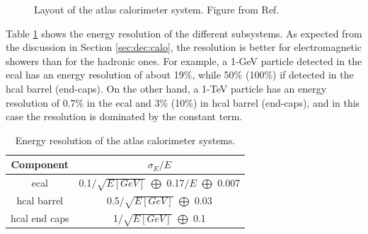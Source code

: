 \begin{figure}[ht]
\centering
{}
\caption{Layout of the \gls{atlas} calorimeter system. Figure from Ref. \cite{atlas:atlas}}
\label{fig:atlas:calo}
\end{figure}

Table \ref{tab:atlas:cal:reso} shows the energy resolution of the different subsystems. As expected from the discussion in Section \ref{sec:dec:calo}, the resolution is better for electromagnetic showers than for the hadronic ones. For example, a 1-GeV particle detected in the \gls{ecal} has an energy resolution of about 19\%, while 50\% (100\%) if detected in the \gls{hcal} barrel (end-caps). On the other hand, a 1-TeV particle has an energy resolution of 0.7\% in the \gls{ecal} and 3\% (10\%) in  \gls{hcal} barrel (end-caps), and in this case the resolution is dominated by the constant term.

\begin{table}[ht]
\begin{center}
\begin{tabular}{c c }
\hline
Component & $\sigma_E / E$ \\
\hline 
\hline
\gls{ecal} & 0.1$/\sqrt{E[GeV]}$ $\bigoplus$ 0.17$/E$ $\bigoplus$ 0.007 \\ %
\hline
\gls{hcal} barrel & 0.5$/\sqrt{E[GeV]}$ $\bigoplus$ 0.03 \\
\hline
\gls{hcal} end caps & 1$/\sqrt{E[GeV]}$ $\bigoplus$ 0.1 \\
\hline
\end{tabular}
\end{center}
\caption{Energy resolution of the \gls{atlas} calorimeter systems.}
\label{tab:atlas:cal:reso}
\end{table}

